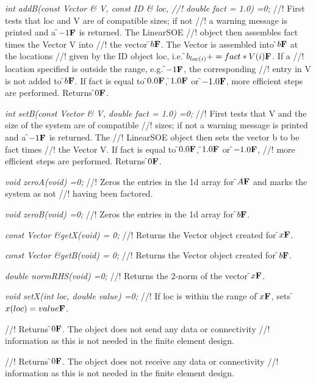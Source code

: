 {\em int addB(const Vector \& V, const ID \& loc,
//! double fact = 1.0) =0;}
//! First tests that \p loc and \p V are of compatible sizes; if not
//! a warning message is printed and a \f$-1{\bf F}$ is returned. The LinearSOE
//! object then assembles \p fact times the Vector \p V into
//! the vector \f$b{\bf F}$. The Vector is assembled into \f$b{\bf F}$ at the locations
//! given by the ID object \p loc, i.e. \f$b_{loc(i)} += fact * V(i){\bf F}$. If a
//! location specified is outside the range, e.g. \f$-1{\bf F}$, the corresponding
//! entry in \p V is not added to \f$b{\bf F}$. If \p fact is equal to \f$0.0{\bf F}$,
\f$1.0{\bf F}$ or \f$-1.0{\bf F}$, more efficient steps are performed. Returns \f$0{\bf F}$.

{\em int setB(const Vector \& V, double fact = 1.0) =0;}
//! First tests that \p V and the size of the system are of compatible
//! sizes; if not a warning message is printed and a \f$-1{\bf F}$ is returned. The
//! LinearSOE object then sets the vector \p b to be \p fact times
//! the Vector \p V. If \p fact is equal to \f$0.0{\bf F}$, \f$1.0{\bf F}$ or \f$-1.0{\bf F}$,
//! more efficient steps are performed. Returns \f$0{\bf F}$. 

{\em void zeroA(void) =0;}
//! Zeros the entries in the 1d array for \f$A{\bf F}$ and marks the system as not
//! having been factored.

{\em void zeroB(void) =0;}
//! Zeros the entries in the 1d array for \f$b{\bf F}$.

{\em const Vector \&getX(void) = 0;}
//! Returns the Vector object created for \f$x{\bf F}$.

{\em const Vector \&getB(void) = 0;}
//! Returns the Vector object created for \f$b{\bf F}$.

{\em double normRHS(void) =0;}
//! Returns the 2-norm of the vector \f$x{\bf F}$.

{\em void setX(int loc, double value) =0;}
//! If \p loc is within the range of \f$x{\bf F}$, sets \f$x(loc) = value{\bf F}$.

//! Returns \f$0{\bf F}$. The object does not send any data or connectivity
//! information as this is not needed in the finite element design.

//! Returns \f$0{\bf F}$. The object does not receive any data or connectivity
//! information as this is not needed in the finite element design.











